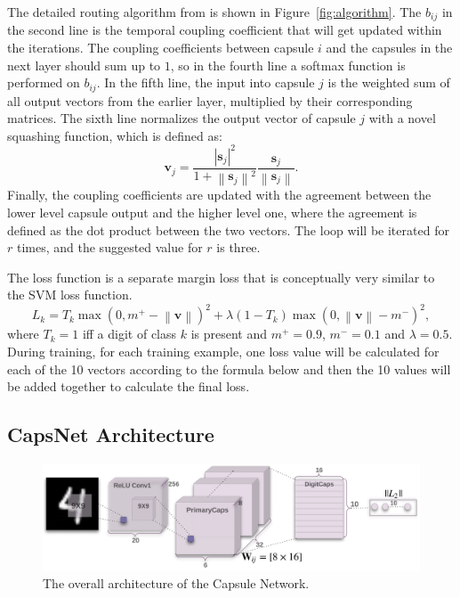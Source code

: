 \documentclass{article}
\begin{document}
The detailed routing algorithm from \cite{sabour2017dynamic} is shown in Figure~\ref{fig:algorithm}. The $b_{ij}$ in the second line is the temporal coupling coefficient that will get updated within the iterations. The coupling coefficients between capsule $i$ and the capsules in the next layer should sum up to $1$, so in the fourth line a softmax function is performed on $b_{ij}$. In the fifth line, the input into capsule $j$ is the weighted sum of all output vectors from the earlier layer, multiplied by their corresponding matrices. The sixth line normalizes the output vector of capsule $j$ with a novel squashing function, which is defined as:
$$
\mathbf{v}_j = \frac{\left|\mathbf{s}_j\right|^2}{1 + \left\| \mathbf{s}_j\right\|^2}\frac{\mathbf{s}_j}{\left\| \mathbf{s}_j\right\|}.
$$
Finally, the coupling coefficients are updated with the agreement between the lower level capsule output and the higher level one, where the agreement is defined as the dot product between the two vectors. The loop will be iterated for $r$ times, and the suggested value for $r$ is three.

The loss function is a separate margin loss that is conceptually very similar to the SVM loss function. 
$$
L_k = T_k \max(0, m^+ - \left\| \mathbf{v}\right\|)^2 + \lambda (1-T_k) \max (0, \left\| \mathbf{v} \right\| - m^-)^2,
$$
where $T_k = 1$ iff a digit of class $k$ is present and $m^+ = 0.9$, $m^-=0.1$ and $\lambda = 0.5$. During training, for each training example, one loss value will be calculated for each of the 10 vectors according to the formula below and then the 10 values will be added together to calculate the final loss. 

\subsection{CapsNet Architecture}

\begin{figure}[!htb]
	\centering\includegraphics[width=\textwidth]{fig/architecture}
	\caption{The overall architecture of the Capsule Network.}\label{fig:architecture}
\end{figure}
\end{document}
